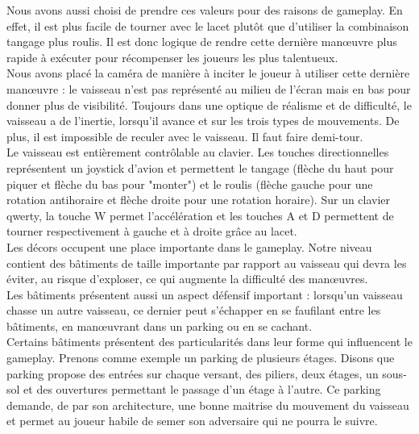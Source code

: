 \documentclass[12pt, titlepage]{article}
\begin{document}
\begin{spacing}{1.5}
Nous avons aussi choisi de prendre ces valeurs pour des raisons de gameplay. En effet, il est plus facile de tourner avec le lacet plutôt que d'utiliser la combinaison tangage plus roulis. Il est donc logique de rendre cette dernière manœuvre plus rapide à exécuter pour récompenser les joueurs les plus talentueux. \\

Nous avons placé la caméra de manière à inciter le joueur à utiliser cette dernière manœuvre : le vaisseau n'est pas représenté au milieu de l'écran mais en bas pour donner plus de visibilité. Toujours dans une optique de réalisme et de difficulté, le vaisseau a de l'inertie, lorsqu'il avance et sur les trois types de mouvements. De plus, il est impossible de reculer avec le vaisseau. Il faut faire demi-tour. \\

Le vaisseau est entièrement contrôlable au clavier. Les touches directionnelles représentent un joystick d'avion et permettent le tangage (flèche du haut pour piquer et flèche du bas pour "monter") et le roulis (flèche gauche pour une rotation antihoraire et flèche droite pour une rotation horaire). Sur un clavier qwerty, la touche W permet l'accélération et les touches A et D permettent de tourner respectivement à gauche et à droite grâce au lacet.\\

Les décors occupent une place importante dans le gameplay. Notre niveau contient des bâtiments de taille importante par rapport au vaisseau qui devra les éviter, au risque d'exploser, ce qui augmente la difficulté des manœuvres.\\

Les bâtiments présentent aussi un aspect défensif important : lorsqu'un vaisseau chasse un autre vaisseau, ce dernier peut s'échapper en se faufilant entre les bâtiments, en manœuvrant dans un parking ou en se cachant. \\

Certains bâtiments présentent des particularités dans leur forme qui influencent le gameplay. Prenons comme exemple un parking de plusieurs étages. Disons que parking propose des entrées sur chaque versant, des piliers, deux étages, un sous-sol et des ouvertures permettant le passage d'un étage à l'autre. Ce parking demande, de par son architecture, une bonne maitrise du mouvement du vaisseau et permet au joueur habile de semer son adversaire qui ne pourra le suivre. \\


\end{spacing}
\end{document}
